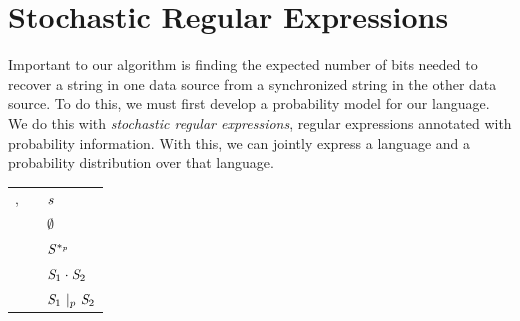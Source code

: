 \documentclass[acmsmall,screen,anonymous]{acmart}
\begin{document}

\section{Stochastic Regular Expressions}
\label{sec:srx}
Important to our algorithm is finding the expected number of bits needed to
recover a string in one data source from a synchronized string in the other data
source. To do this, we must first develop a probability model for our language.
We do this with \emph{stochastic regular expressions}, regular expressions
annotated with probability information. With this, we can jointly express a
language and a probability distribution over that language.

\begin{center}
  \begin{tabular}{rcl}
    \Regex{},\RegexAlt{}
    & \GEq{} & $\String$ \\
    & \GBar{} & $\emptyset$ \\
    & \GBar{} & $\PRegexStar{\Regex}{p}$ \\
    & \GBar{} & $\RegexConcat{\Regex_1}{\Regex_2}$ \\
    & \GBar{} & $\PRegexOr{\Regex_1}{\Regex_2}{p}$
  \end{tabular}
\end{center}
\end{document}
